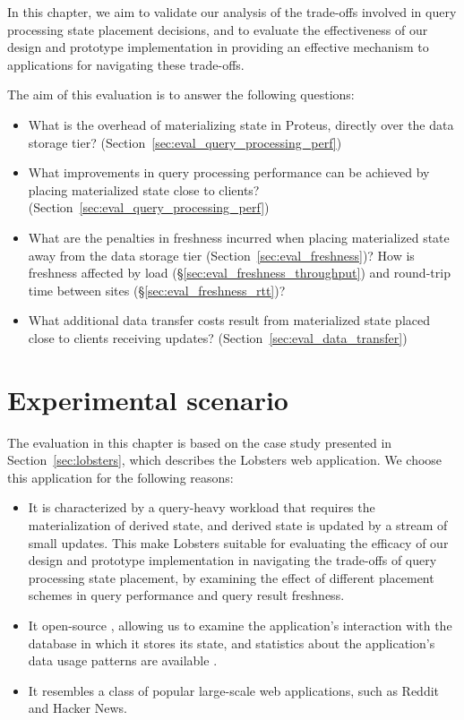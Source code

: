 In this chapter, we aim to validate our analysis of the trade-offs involved in query processing state placement decisions,
and to evaluate the effectiveness of our design and prototype implementation in providing an effective mechanism to applications
for navigating these trade-offs.

The aim of this evaluation is to answer the following questions:

\begin{itemize}

  \item What is the overhead of materializing state in Proteus, directly over the data storage tier?
  (Section~\ref{sec:eval_query_processing_perf})

  \item What improvements in query processing performance can be achieved by placing materialized state close to clients?
  (Section~\ref{sec:eval_query_processing_perf})

  \item What are the penalties in freshness incurred when placing materialized state away from the data storage tier
  (Section~\ref{sec:eval_freshness})?
  How is freshness affected by load (\S\ref{sec:eval_freshness_throughput}) and round-trip time between
  sites (\S\ref{sec:eval_freshness_rtt})?

  \item What additional data transfer costs result from materialized state placed close to clients receiving updates?
  (Section~\ref{sec:eval_data_transfer})

\end{itemize}

\section{Experimental scenario}
\label{sec:eval_scenario}

The evaluation in this chapter is based on the case study presented in Section~\ref{sec:lobsters},
which describes the Lobsters \cite{lobste:rs} web application.
We choose this application for the following reasons:
\begin{itemize}
\item It is characterized by a query-heavy workload that requires the materialization of derived state,
and derived state is updated by a stream of small updates.
This make Lobsters suitable for evaluating the efficacy of our design and prototype implementation in
navigating the trade-offs of query processing state placement,
by examining the effect of different placement schemes in query performance and query result freshness.

\item It open-source \cite{lobsters:source},
allowing us to examine the application's interaction with the database in which it stores its state,
and statistics about the application's data usage patterns are available \cite{lobste:stats}.

\item It resembles a class of popular large-scale web applications, such as Reddit and Hacker News.
\end{itemize}

